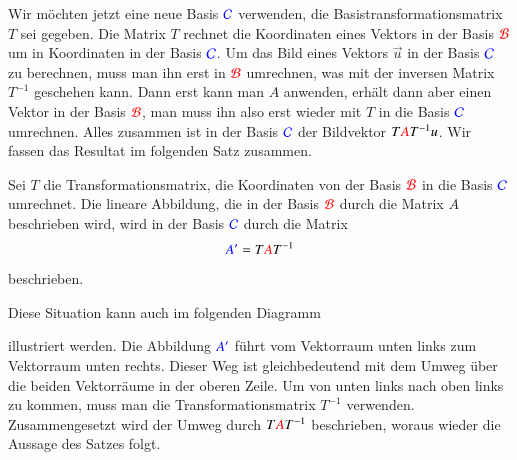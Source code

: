 Wir möchten jetzt eine neue Basis $\color{blue}\mathcal{C}$ verwenden, die
Basistransformationsmatrix $T$ sei gegeben.
Die Matrix $T$ rechnet die Koordinaten eines Vektors in der Basis
$\color{red}\mathcal{B}$ um in Koordinaten in der Basis
$\color{blue}\mathcal{C}$.
Um das Bild eines Vektors $\vec{u}$ in der Basis $\color{blue}\mathcal{C}$ 
zu berechnen, muss man ihn erst in $\color{red}\mathcal{B}$ umrechnen, was
mit der inversen Matrix $T^{-1}$ geschehen kann.
Dann erst kann man $A$ anwenden, erhält dann aber einen Vektor
in der Basis $\color{red}\mathcal{B}$, man muss ihn also erst wieder
mit $T$ in die Basis $\color{blue}\mathcal{C}$ umrechnen.
Alles zusammen ist in der Basis $\color{blue}\mathcal{C}$ der Bildvektor 
$T{\color{red}A}T^{-1}u$.
Wir fassen das Resultat im folgenden Satz zusammen.

\begin{satz}
\label{skript:affin:basiswechsel:satz}
Sei $T$ die Transformationsmatrix, die Koordinaten von der Basis
$\color{red}\mathcal{B}$ in die Basis $\color{blue}\mathcal{C}$ umrechnet.
Die lineare Abbildung, die in der Basis $\color{red}\mathcal{B}$ durch die
Matrix $A$ beschrieben wird, wird in der Basis $\color{blue}\mathcal{C}$ durch
die Matrix
\begin{equation}
{\color{blue}A'}=T{\color{red}A}T^{-1}
\label{abbildung-basiswechsel}
\end{equation}
beschrieben.
\end{satz}

Diese Situation kann auch im folgenden Diagramm
\begin{center}
\end{center}
illustriert werden.
Die Abbildung $\color{blue}A'$ führt vom Vektorraum unten links zum
Vektorraum unten rechts.
Dieser Weg ist gleichbedeutend mit dem Umweg über die beiden Vektorräume
in der oberen Zeile.
Um von unten links nach oben links zu kommen, muss man die
Transformationsmatrix $T^{-1}$ verwenden.
Zusammengesetzt wird der Umweg durch $T{\color{red}A}T^{-1}$ beschrieben,
woraus wieder die Aussage des Satzes folgt.


